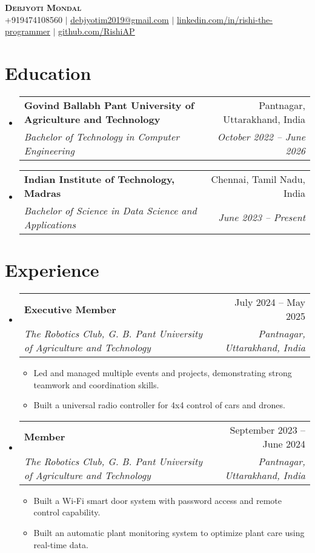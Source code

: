 \documentclass[letterpaper,11pt]{article}
\makeatletter
\newcommand{\resumeItem}[1]{
  \item\small{
    {#1 \vspace{-2pt}}
  }
}
\newcommand{\resumeSubheading}[4]{
  \vspace{-2pt}\item
    \begin{tabular*}{0.97\textwidth}[t]{l@{\extracolsep{\fill}}r}
      \textbf{#1} & #2 \\
      \textit{\small#3} & \textit{\small #4} \\
    \end{tabular*}\vspace{-7pt}
}
\newcommand{\resumeSubSubheading}[2]{
    \item
    \begin{tabular*}{0.97\textwidth}{l@{\extracolsep{\fill}}r}
      \textit{\small#1} & \textit{\small #2} \\
    \end{tabular*}\vspace{-7pt}
}
\newcommand{\resumeSubHeadingListStart}{\begin{itemize}[leftmargin=0.15in, label={}]}
\newcommand{\resumeSubHeadingListEnd}{\end{itemize}}
\newcommand{\resumeItemListStart}{\begin{itemize}}
\newcommand{\resumeItemListEnd}{\end{itemize}\vspace{-5pt}}
\makeatother
\begin{document}

\begin{center}
    \textbf{\Huge \scshape Debjyoti Mondal} \\ \vspace{1pt}
    \small +919474108560 $|$ \href{mailto:debjyotim2019@gmail.com}{\underline{debjyotim2019@gmail.com}} $|$ 
    \href{https://linkedin.com/in/rishi-the-programmer}{\underline{linkedin.com/in/rishi-the-programmer}} $|$
    \href{https://github.com/RishiAP}{\underline{github.com/RishiAP}}
\end{center}


\section{Education}
  \resumeSubHeadingListStart
    \resumeSubheading
      {Govind Ballabh Pant University of Agriculture and Technology}{Pantnagar, Uttarakhand, India}
      {Bachelor of Technology in Computer Engineering}{October 2022 -- June 2026}
    \resumeSubheading
      {Indian Institute of Technology, Madras}{Chennai, Tamil Nadu, India}
      {Bachelor of Science in Data Science and Applications}{June 2023 -- Present}
  \resumeSubHeadingListEnd


\section{Experience}
  \resumeSubHeadingListStart

    \resumeSubheading
      {Executive Member}{July 2024 -- May 2025}
      {The Robotics Club, G. B. Pant University of Agriculture and Technology}{Pantnagar, Uttarakhand, India}
      \resumeItemListStart
      \resumeItem{Led and managed multiple events and projects, demonstrating strong teamwork and coordination skills.}
      \resumeItem{Built a universal radio controller for 4x4 control of cars and drones.}
      \resumeItemListEnd
      

    \resumeSubheading
      {Member}{September 2023 -- June 2024}
      {The Robotics Club, G. B. Pant University of Agriculture and Technology}{Pantnagar, Uttarakhand, India}
      \resumeItemListStart
        \resumeItem{Built a Wi-Fi smart door system with password access and remote control capability.}
        \resumeItem{Built an automatic plant monitoring system to
        optimize plant care using real-time data.}
      \resumeItemListEnd
  \resumeSubHeadingListEnd
\end{document}
